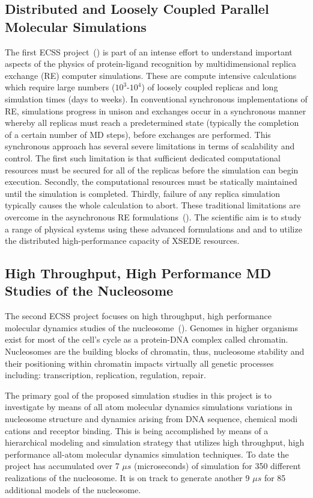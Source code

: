 \documentclass{sig-alternate}
\begin{document}
\subsection{Distributed and Loosely Coupled Parallel Molecular Simulations}
The first ECSS project~(\cite{RonLevy}) is part of an intense effort
to understand important aspects of the physics of protein-ligand
recognition by multidimensional replica exchange (RE) computer
simulations. These are compute intensive calculations which require
large numbers ($10^3$-$10^4$) of loosely coupled replicas and long
simulation times (days to weeks). In conventional synchronous
implementations of RE, simulations progress in unison and exchanges
occur in a synchronous manner whereby all replicas must reach a
predetermined state (typically the completion of a certain number of
MD steps), before exchanges are performed. This synchronous approach
has several severe limitations in terms of scalability and
control. The first such limitation is that sufficient dedicated computational resources must be secured for all of the replicas before the simulation can
begin execution. Secondly, the computational resources must be
statically maintained until the simulation is completed. Thirdly,
failure of any replica simulation typically causes the whole
calculation to abort. These traditional limitations are overcome
in the asynchronous RE formulations~(\cite{EmilioLevy}). The scientific aim is to study a
range of physical systems using these advanced formulations and and to
utilize the distributed high-performance capacity of XSEDE resources.

\subsection{High Throughput, High Performance MD Studies of the
  Nucleosome}

The second ECSS project focuses on high throughput,
high performance molecular dynamics studies of the nucleosome~(\cite{TomBishop}). Genomes in higher organisms exist for most of
the cell's cycle as a protein-DNA complex called chromatin.
Nucleosomes are the building blocks of chromatin, thus, nucleosome
stability and their positioning within chromatin
impacts virtually all genetic processes including: transcription,
replication, regulation, repair.

The primary goal of the proposed simulation studies in
this project is to investigate by means of all atom molecular
dynamics simulations variations in nucleosome structure
and dynamics arising from DNA sequence, chemical modi cations and
receptor binding. This is being accomplished by means
of a hierarchical modeling and simulation strategy that utilizes
high throughput, high performance all-atom molecular
dynamics simulation techniques. To date the project has accumulated
over 7 $\mu s$ (microseconds) of simulation for 350 different
realizations of the nucleosome. It is on track to generate another 9 $\mu s$ for 85 additional models of the nucleosome.
\end{document}
